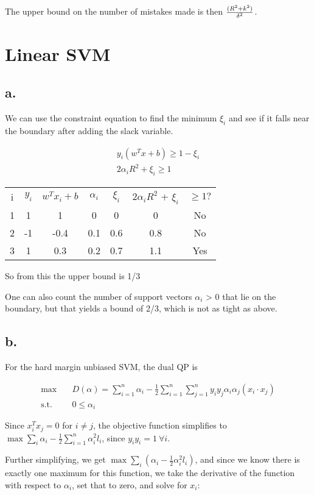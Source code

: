 \documentclass[]{article}
\begin{document}
The upper bound on the number of mistakes made is then ${\large\frac{(R^{2} + k^{2})}{\delta^2}}$.

\section{Linear SVM}

\subsection{a.}
We can use the constraint equation to find the minimum $\xi_i$ and see if it falls near the boundary after adding the slack variable.

\begin{align*}
y_i\left(w^T x + b\right) \geq 1 - \xi_i \\
2\alpha_i R^2 + \xi_i \geq 1
\end{align*}
\begin{tabular}{|c|c|c|c|c|c|c|}
\hline
i & $y_i$ & $w^T x_i + b$ & $\alpha_i$ & $\xi_i$ & $2\alpha_i R^2$ + $\xi_i$  & $\geq 1?$ \\
1 & 1 & 1 & 0 & 0 & 0 & No\\
2 & -1 & -0.4 & 0.1 & 0.6 & 0.8 & No\\
3 & 1 & 0.3 & 0.2 & 0.7 & 1.1 & Yes\\
\hline
\end{tabular}

So from this the upper bound is 1/3

One can also count the number of support vectors $\alpha_i$ > 0 that lie on the boundary, but that yields a bound of 2/3, which is not as tight as above.


\subsection{b.}
For the hard margin unbiased SVM, the dual QP is

\begin{align*}
\max\quad & D(\alpha) = \sum_{i=1}^n \alpha_i - \frac{1}{2} \sum_{i=1}^n \sum_{j=1}^n y_iy_j\alpha_i\alpha_j(x_i \cdot x_j)\\
\text{s.t.}\quad & 0 \le \alpha_i
\end{align*}

Since $x_i^Tx_j = 0$ for $i \neq j$, the objective function simplifies to $\max \sum_i \alpha_i - \frac{1}{2}\sum_{i=1}^n \alpha_i^2 l_i$, since $y_iy_i = 1~\forall i$.

Further simplifying, we get $\max \sum_i \left( \alpha_i - \frac{1}{2}\alpha_i^{2} l_i\right)$, and since we know there is exactly one maximum for
this function, we take the derivative of the function with respect to $\alpha_i$, set that to zero, and solve for $x_i$:
\end{document}
